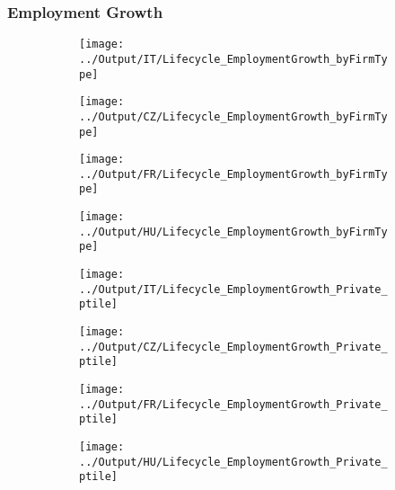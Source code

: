 \documentclass[12pt,notitlepage]{article}
\begin{document}
\subsubsection{Employment Growth}
\begin{figure}[!htpb]
\centering
\caption{Employment Growth (Average)}
\begin{subfigure}{.49\textwidth}
    \centering
 \texttt{[image: ../Output/IT/Lifecycle\_EmploymentGrowth\_byFirmType]}
\end{subfigure}%
\begin{subfigure}{.49\textwidth}
    \centering
 \texttt{[image: ../Output/CZ/Lifecycle\_EmploymentGrowth\_byFirmType]}
\end{subfigure}
\begin{subfigure}{.49\textwidth}
    \centering
 \texttt{[image: ../Output/FR/Lifecycle\_EmploymentGrowth\_byFirmType]}
\end{subfigure}%
\begin{subfigure}{.49\textwidth}
    \centering
 \texttt{[image: ../Output/HU/Lifecycle\_EmploymentGrowth\_byFirmType]}
\end{subfigure}
\end{figure}
\pagebreak

\begin{figure}[!htpb]
\centering
\caption{Employment Growth (Percentile - Private)}
\begin{subfigure}{.49\textwidth}
    \centering
 \texttt{[image: ../Output/IT/Lifecycle\_EmploymentGrowth\_Private\_ptile]}
\end{subfigure}%
\begin{subfigure}{.49\textwidth}
    \centering
 \texttt{[image: ../Output/CZ/Lifecycle\_EmploymentGrowth\_Private\_ptile]}
\end{subfigure}
\begin{subfigure}{.49\textwidth}
    \centering
 \texttt{[image: ../Output/FR/Lifecycle\_EmploymentGrowth\_Private\_ptile]}
\end{subfigure}%
\begin{subfigure}{.49\textwidth}
    \centering
 \texttt{[image: ../Output/HU/Lifecycle\_EmploymentGrowth\_Private\_ptile]}
\end{subfigure}
\end{figure}
\pagebreak
\end{document}
